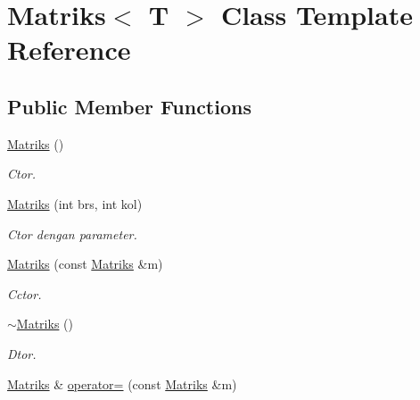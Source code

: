 \hypertarget{classMatriks}{\section{Matriks$<$ T $>$ Class Template Reference}
\label{classMatriks}
}
\subsection*{Public Member Functions}
\begin{DoxyCompactItemize}
\item 
\hyperlink{classMatriks_a87240a063bdac4cf112c8107163df023}{Matriks} ()
\begin{DoxyCompactList}\small\item\em Ctor. \end{DoxyCompactList}\item 
\hypertarget{classMatriks_a47fd3391f6dac884e8f9653ef09bd5c9}{\hyperlink{classMatriks_a47fd3391f6dac884e8f9653ef09bd5c9}{Matriks} (int brs, int kol)}\label{classMatriks_a47fd3391f6dac884e8f9653ef09bd5c9}

\begin{DoxyCompactList}\small\item\em Ctor dengan parameter. \end{DoxyCompactList}\item 
\hypertarget{classMatriks_afde805eda48652899d0dddedb7f26661}{\hyperlink{classMatriks_afde805eda48652899d0dddedb7f26661}{Matriks} (const \hyperlink{classMatriks}{Matriks} \&m)}\label{classMatriks_afde805eda48652899d0dddedb7f26661}

\begin{DoxyCompactList}\small\item\em Cctor. \end{DoxyCompactList}\item 
\hypertarget{classMatriks_a0ab40d7cdf9abaa1216993c8ad650f30}{\hyperlink{classMatriks_a0ab40d7cdf9abaa1216993c8ad650f30}{$\sim$\-Matriks} ()}\label{classMatriks_a0ab40d7cdf9abaa1216993c8ad650f30}

\begin{DoxyCompactList}\small\item\em Dtor. \end{DoxyCompactList}\item 
\hypertarget{classMatriks_a1e7babc42e237ab38bf635a3c9fde337}{\hyperlink{classMatriks}{Matriks} \& \hyperlink{classMatriks_a1e7babc42e237ab38bf635a3c9fde337}{operator=} (const \hyperlink{classMatriks}{Matriks} \&m)}\label{classMatriks_a1e7babc42e237ab38bf635a3c9fde337}


\end{DoxyCompactItemize}
